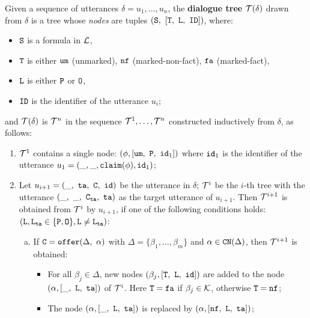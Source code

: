 \begin{definition}
\label{def:dia-tree-DLAF}
Given a sequence of utterances $\delta = u_1, \ldots, u_n$, the \textbf{dialogue tree} $\mathcal{T} (\delta)$ drawn from $\delta$ is a tree whose \emph{nodes} are tuples $(\texttt{\textup{S}},\ [\texttt{\textup{T}},\ \texttt{\textup{L}},\ \texttt{\textup{ID}}])$, where:
    \begin{itemize}
        \item $\texttt{\textup{S}}$ is a formula in $\mathcal{L}$,
        \item $\texttt{\textup{T}}$ is either $\texttt{\textup{um}}$ (unmarked), $\texttt{\textup{nf}}$ (marked-non-fact), $\texttt{\textup{fa}}$ (marked-fact),
        \item $\texttt{\textup{L}}$ is either $\texttt{\textup{P}}$ or $\texttt{\textup{O}}$,
        \item $\texttt{\textup{ID}}$ is the identifier of the utterance $u_i$;
    \end{itemize}

and $\mathcal{T}(\delta)$ is $\mathcal{T}^{n}$ in the sequence $\mathcal{T}^{1}, \ldots, \mathcal{T}^{n}$ constructed inductively from $\delta$, as follows:
 \begin{enumerate}
     \item $\mathcal{T}^{1}$ contains a single node: $(\phi, [\texttt{\textup{um}} ,\ \texttt{\textup{P}},\ \texttt{\textup{id}}_1])$ where $\texttt{\textup{id}}_1$ is the identifier of the utterance $u_1 = (\_, \_, \texttt{\textup{claim}}(\phi), \texttt{\textup{id}}_1)$;

     \item  Let $u_{i+1} = (\_,\ \tg,\ \CO ,\ \id)$ be the utterance in $\delta$; $\mathcal{T}^i$ be the $i$-th tree with the utterance $(\_,\ \_,\ \CO_{\tg},\ \tg)$ as the target utterance of $u_{i+1}$.
     Then $\mathcal{T}^{i+1}$ is obtained from $\mathcal{T}^i$ by $u_{i+1}$, if one of the following conditions holds: $(\texttt{\textup{L}}, \texttt{\textup{L}}_{\texttt{\textup{ta}}} \in \{\texttt{\textup{P}}, \texttt{\textup{O}}\}, \texttt{\textup{L}} \neq \texttt{\textup{L}}_{\texttt{\textup{ta}}})$:
    
     \begin{enumerate} [a)]%
          \item If $\texttt{\textup{C}} = \texttt{\textup{offer}}(\Delta,\ \alpha)$ with $\Delta = \{\beta_1, \ldots, \beta_m \}$ and $\alpha \in \texttt{\textup{CN}}(\Delta)$,  then $\mathcal{T}^{i+1}$ is obtained: 
       
        \begin{itemize}
            \item For all $\beta_j \in \Delta$, new nodes $(\beta_j, [\tT,\ \tL,\ \id])$ are added to the node $(\alpha, [\_,\ \tL ,\ \tg])$ of $\mathcal{T}^i$. Here $\texttt{\textup{T}} = \texttt{\textup{fa}}$ if $\beta_j \in \mathcal{K}$, otherwise $\texttt{\textup{T}} = \texttt{\textup{nf}}$;

            \item  The node $(\alpha, [\_,\ \tL ,\ \tg])$ is replaced by $(\alpha, [\nf,\ \tL ,\ \tg])$;
        \end{itemize}      
        

\end{enumerate}
\end{enumerate}
\end{definition}
